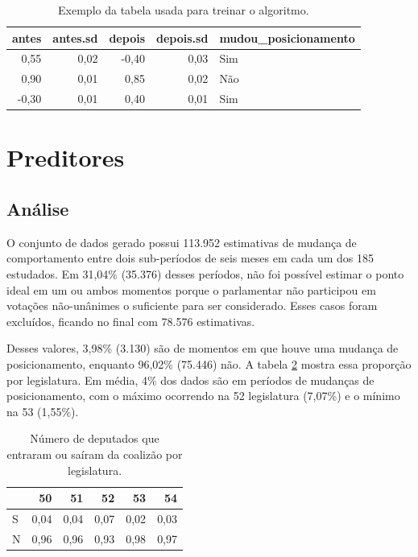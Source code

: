 \documentclass[a4paper,titlepage]{ppgi}\usepackage[]{graphicx}\usepackage[]{color}
\newenvironment{knitrout}{}{} %
\begin{document}
\begin{table}
\centering
\begin{knitrout}
\color{fgcolor}
\begin{tabular}{r|r|r|r|l}
\hline
antes & antes.sd & depois & depois.sd & mudou\_posicionamento\\
\hline
0,55 & 0,02 & -0,40 & 0,03 & Sim\\
\hline
0,90 & 0,01 & 0,85 & 0,02 & Não\\
\hline
-0,30 & 0,01 & 0,40 & 0,01 & Sim\\
\hline
\end{tabular}


\end{knitrout}
\caption{Exemplo da tabela usada para treinar o algoritmo.}
\label{table:dataset-final}
\end{table}


\section{Preditores}

\subsection{Análise}



O conjunto de dados gerado possui 113.952 estimativas de mudança
de comportamento entre dois sub-períodos de seis meses em cada um dos
185 estudados. Em 31,04\% (35.376) desses períodos, não foi possível
estimar o ponto ideal em um ou ambos momentos porque o parlamentar não
participou em votações não-unânimes o suficiente para ser considerado. Esses
casos foram excluídos, ficando no final com 78.576 estimativas.

Desses valores, 3,98\%
(3.130) são de momentos em que houve uma mudança de
posicionamento, enquanto 96,02\% (75.446) não. A tabela
\ref{table:coalition-changes-per-legislature} mostra essa proporção por
legislatura. Em média,
4\% dos dados
são em períodos de mudanças de posicionamento, com o máximo ocorrendo na
52\textordfeminine{} legislatura
(7,07\%) e o
mínimo na 53\textordfeminine{}
(1,55\%).

\begin{table}
\centering
\begin{knitrout}
\color{fgcolor}
\begin{tabular}{l|r|r|r|r|r}
\hline
  & 50 & 51 & 52 & 53 & 54\\
\hline
S & 0,04 & 0,04 & 0,07 & 0,02 & 0,03\\
\hline
N & 0,96 & 0,96 & 0,93 & 0,98 & 0,97\\
\hline
\end{tabular}


\end{knitrout}
\caption{Número de deputados que entraram ou saíram da coalizão por legislatura.}
\label{table:coalition-changes-per-legislature}
\end{table}
\end{document}
